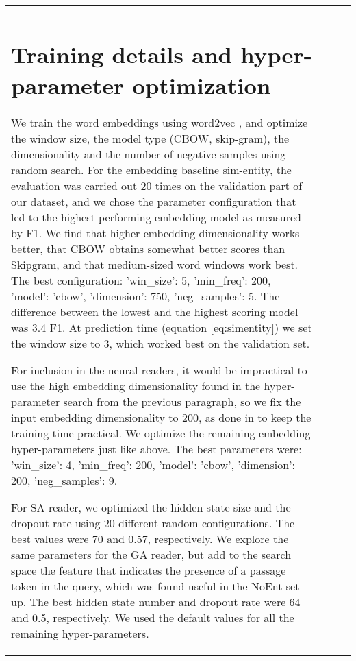 \documentclass[11pt,a4paper]{article}
\begin{document}
\begin{table}[t]
\begin{tabular}{p{2.7cm} p{1.8cm} l r}
{


\appendix
\section{Training details and hyper-parameter optimization}\label{app:hyper}


We train the word embeddings using word2vec \citep{MikolovEtAl2013a}, and optimize the window size, the model type (CBOW, skip-gram), the dimensionality and the number of negative samples using random search. For the embedding baseline sim-entity, the evaluation was carried out 20 times on the validation part of our dataset, and we chose the parameter configuration that led to the highest-performing embedding model as measured by F1. We find that higher embedding dimensionality works better, that CBOW obtains somewhat better scores than Skipgram, and that medium-sized word windows work best. The best configuration: 'win\_size': 5, 'min\_freq': 200, 'model': 'cbow', 'dimension': 750, 'neg\_samples': 5. The difference between the lowest and the highest scoring model was 3.4 F1. At prediction time (equation \eqref{eq:simentity}) we set the window size to 3, which worked best on the validation set.




For inclusion in the neural readers, it would be impractical to use the high embedding dimensionality found in the hyper-parameter search from the previous paragraph, so we fix the input embedding dimensionality to 200, as done in \citet{ChenEtAl2016} to keep the training time practical. We optimize the remaining embedding hyper-parameters just like above. The best parameters were: 'win\_size': 4, 'min\_freq': 200, 'model': 'cbow', 'dimension': 200, 'neg\_samples': 9.


For SA reader, we optimized the hidden state size and the dropout rate using 20 different random configurations. The best values were 70 and 0.57, respectively. We explore the same parameters for the GA reader, but add to the search space the feature that indicates the presence of a passage token in the query, which was found useful in the NoEnt set-up.
The best hidden state number and dropout rate were 64 and 0.5, respectively. 
We used the default values for all the remaining hyper-parameters.

}
\end{tabular}
\end{table}
\end{document}
